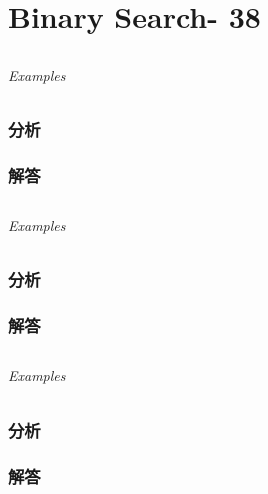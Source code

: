 \documentclass[UTF8,a4paper,12pt]{ctexbook}
\begin{document}
\chapter{Binary Search- 38}

\section{}
	
	\subparagraph{Examples}
	
	\subsection{分析}
	
	\subsection{解答}
	
\section{}
	
	\subparagraph{Examples}
	
	\subsection{分析}
	
	\subsection{解答}
	
\section{}
	
	\subparagraph{Examples}
	
	\subsection{分析}
	
	\subsection{解答}
	
\section{}
	
\end{document}
